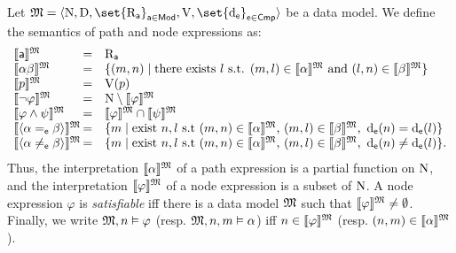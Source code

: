 \begin{definition} \label{def:xpath:semantics}
    Let $\model=\tup{\N, \D, \set{\R_{\apath}}_{\apath \in \mods}, \valuation,\set{\data_\cmp}_{\cmp \in \cmps}}$ be a data model. 
    We define the semantics of path and node expressions as:
    \[\begin{array}{l@{\, } c l}
        \truthset{ \apath }{\model}  
            & = & \R_\apath \\
        \truthset{ \alpha\beta }{\model}  
            & = & \{(m,n)\mid \text{there exists } l \text{ s.t. } (m,l)\in\truthset{\alpha}{\model} \text{ and } (l,n)\in \truthset{\beta}{\model}\} \\
        \truthset{ p }{\model}  & = & \valuation(p)  \\
        \truthset{ \lnot \varphi }{\model}  
            & = & \N \setminus \truthset{ \varphi }{\model} \\
        \truthset{ \varphi \land \psi }{\model}  
            & = & \truthset{ \varphi  }{\model}  \cap \truthset{  \psi }{\model}
            \\    
        \truthset{ \tup{ \alpha =_\cmp \beta } }{\model}   & = & \{ m \mid  \text{exist } n,l \text{ s.t } (m,n) \in  \truthset{ \alpha }{\model} \text{, } (m,l) \in  \truthset{ \beta }{\model}  \text{, }  \data_\cmp(n)=\data_\cmp(l) \} \\
        \truthset{ \tup{ \alpha \neq_\cmp \beta } }{\model}   & = & \{ m \mid  \text{exist } n,l \text{ s.t } (m,n) \in  \truthset{ \alpha }{\model} \text{, } (m,l) \in  \truthset{ \beta }{\model}  \text{, } \data_\cmp(n)\neq\data_\cmp(l) \}.
    \end{array}\]
    Thus, the interpretation $\llbracket{\alpha}\rrbracket^{\mathfrak{M}}$ of a path expression is a partial function on $\mathrm{N}$, and the interpretation $\llbracket{\varphi}\rrbracket^{\mathfrak{M}}$ of a node expression is a subset of $\mathrm{N}$. 
    A node expression $\varphi$ is \emph{satisfiable} iff there is a data model $\mathfrak{M}$ such that $\llbracket{\varphi}\rrbracket^{\mathfrak{M}} \neq \emptyset$. Finally, we write $\mathfrak{M},n\vDash\varphi$ (resp. $\mathfrak{M},n,m\vDash\alpha$) iff $n\in\llbracket{\varphi}\rrbracket^{\mathfrak{M}}$ (resp. $(n,m)\in\llbracket{\alpha}\rrbracket^{\mathfrak{M}}$).
\end{definition}

        